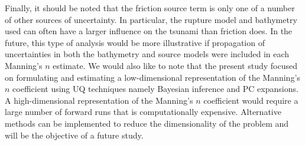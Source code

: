 Finally, it should be noted that the friction source term is only one of a
number of other sources of uncertainty.  In particular, the rupture model and
bathymetry used can often have a larger influence on the tsunami than friction
does.  In the future, this type of analysis would be more illustrative if
propagation of uncertainties in both the bathymetry and source models were
included in each Manning's $n$ estimate.  We would also like to note that the
present study focused on formulating and estimating a low-dimensional
representation of the Manning's $n$ coefficient using UQ techniques namely
Bayesian inference and PC expansions.  A high-dimensional representation of the
Manning's $n$ coefficient would require a large number of forward runs that is
computationally expensive.  Alternative methods can be implemented to reduce the
dimensionality of the problem and will be the objective of a future study.
